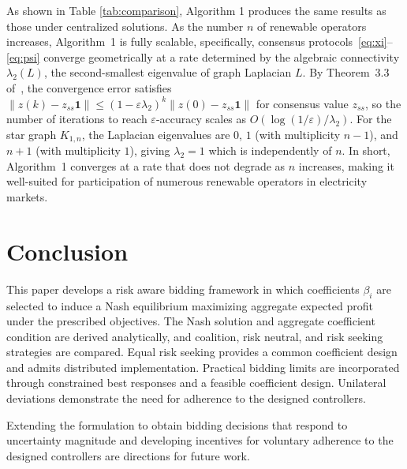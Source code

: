 \documentclass[journal]{IEEEtran}
\newcommand{\one}{\mathbf{1}}
\begin{document}
As shown in Table \ref{tab:comparison}, Algorithm 1 produces the same results as those under centralized solutions. As the number $n$ of renewable operators increases,  Algorithm~1 is fully scalable, specifically, consensus protocols~\eqref{eq:xi}--\eqref{eq:psi} converge geometrically at a rate determined by the algebraic connectivity $\lambda_2(L)$, the second-smallest eigenvalue of graph Laplacian $L$. By Theorem~3.3 of~\cite{qu}, the convergence error satisfies $\|z(k) - z_{ss}\one\| \leq (1-\varepsilon\lambda_2)^k \|z(0) - z_{ss}\one\|$ for consensus value $z_{ss}$, so the number of iterations to reach $\varepsilon$-accuracy scales as $O\!\left(\log(1/\varepsilon)/\lambda_2\right)$. For the star graph $K_{1,n}$, the Laplacian eigenvalues are $0$, $1$ (with multiplicity $n-1$), and $n+1$ (with multiplicity $1$), giving $\lambda_2 = 1$ which is independently of $n$. In short, Algorithm~1 converges at a rate that does not degrade as $n$ increases, making it well-suited for  participation of numerous renewable operators in electricity markets. 

\section{Conclusion}

This paper develops a risk aware bidding framework in which coefficients $\beta_i$ are selected to induce a Nash equilibrium maximizing aggregate expected profit under the prescribed objectives. The Nash solution and aggregate coefficient condition are derived analytically, and coalition, risk neutral, and risk seeking strategies are compared. Equal risk seeking provides a common coefficient design and admits distributed implementation. Practical bidding limits are incorporated through constrained best responses and a feasible coefficient design. Unilateral deviations demonstrate the need for adherence to the designed controllers.

Extending the formulation to obtain bidding decisions that respond to uncertainty magnitude and developing incentives for voluntary adherence to the designed controllers are directions for future work.


\end{document}
